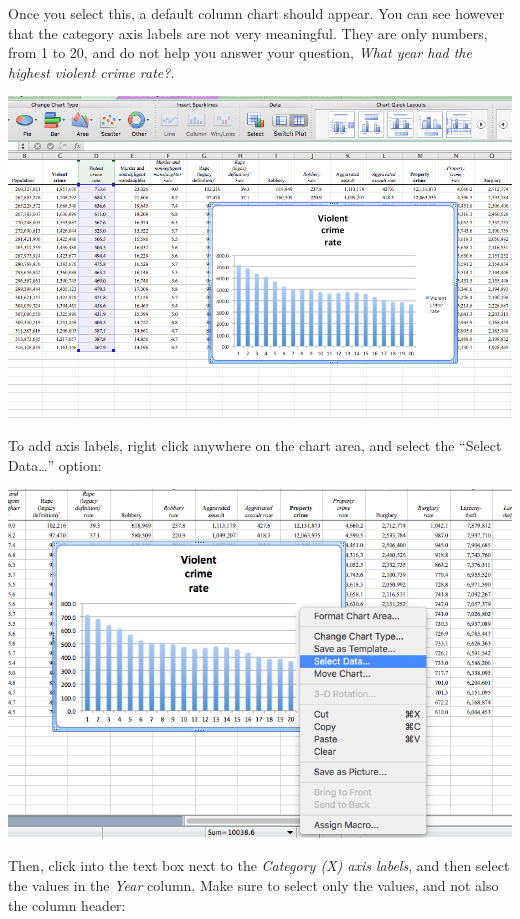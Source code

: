 \documentclass[
]{book}
\begin{document}
Once you select this, a default column chart should appear. You can see however that the category axis labels are not very meaningful. They are only numbers, from 1 to 20, and do not help you answer your question, \emph{What year had the highest violent crime rate?}.

\includegraphics{imgs/desc_viz_2.png}

To add axis labels, right click anywhere on the chart area, and select the ``Select Data\ldots{}'' option:

\includegraphics{imgs/desc_viz_3.png}

Then, click into the text box next to the \emph{Category (X) axis labels}, and then select the values in the \emph{Year} column. Make sure to select only the values, and not also the column header:
\end{document}

